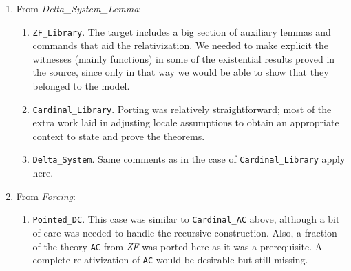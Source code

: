 \documentclass[11pt,a4paper]{article}
\newcommand{\session}[1]{\textit{#1}}
\newcommand{\theory}[1]{\texttt{#1}}
\begin{document}
\begin{enumerate}
\begin{enumerate}
  \end{enumerate}
\item From \session{Delta\_System\_Lemma}:
  \begin{enumerate}
  \item \theory{ZF\_Library}. The target includes a big section of
    auxiliary lemmas and commands that aid the relativization. We
    needed to make explicit the witnesses (mainly functions) in some of the
    existential results proved in the source, since only in that way
    we would be able to show that they belonged to the model.
  \item \theory{Cardinal\_Library}. Porting was relatively
    straightforward; most of the extra work laid in adjusting locale
    assumptions to obtain an appropriate context to state and prove
    the theorems.
  \item \theory{Delta\_System}. Same comments as in the case of
    \theory{Cardinal\_Library} apply here.
  \end{enumerate}
\item From \session{Forcing}:
  \begin{enumerate}
  \item \theory{Pointed\_DC}. This case was similar to
    \theory{Cardinal\_AC} above, although a bit of care was needed to
    handle the recursive construction. Also, a fraction of the theory
    \theory{AC} from \session{ZF} was ported here as it was a
    prerequisite. A complete relativization of \theory{AC} would be
    desirable but still missing.
  \end{enumerate}
\end{enumerate}





\end{document}
